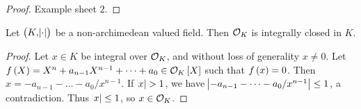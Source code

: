 \begin{proof}
Example sheet $ 2 $.
\end{proof}

\begin{lemma}
\label{lem:6.8}
Let $ \br{K, \abs{\cdot}} $ be a non-archimedean valued field. Then $ \mathcal{O}_K $ is integrally closed in $ K $.
\end{lemma}

\begin{proof}
Let $ x \in K $ be integral over $ \mathcal{O}_K $, and without loss of generality $ x \ne 0 $. Let $ f\br{X} = X^n + a_{n - 1}X^{n - 1} + \dots + a_0 \in \OOO_K\sbr{X} $ such that $ f\br{x} = 0 $. Then $ x = -a_{n - 1} - \dots - a_0 / x^{n - 1} $. If $ \abs{x} > 1 $, we have $ \abs{-a_{n - 1} - \dots - a_0 / x^{n - 1}} \le 1 $, a contradiction. Thus $ \abs{x} \le 1 $, so $ x \in \mathcal{O}_K $.
\end{proof}

\pagebreak

